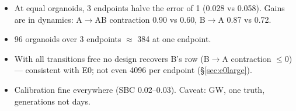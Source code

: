 \documentclass[10pt,a4paper]{article}
\newcommand{\blk}[1]{\par\needspace{5\baselineskip}\smallskip{\sffamily\bfseries\color{inkgray}#1}\par}
\newcommand{\Comment}{\blk{Comment}}
\begin{document}
\Comment
\begin{itemize}
\item At equal organoids, 3 endpoints halve the error of 1 (0.028 vs 0.058). Gains are in dynamics: A$\to$AB contraction 0.90 vs 0.60, B$\to$A 0.87 vs 0.72.
\item 96 organoids over 3 endpoints $\approx$ 384 at one endpoint.
\item With all transitions free no design recovers B's row (B$\to$A contraction $\le 0$) --- consistent with E0; not even 4096 per endpoint (\S\ref{sec:e0large}).
\item Calibration fine everywhere (SBC 0.02--0.03). Caveat: GW, one truth, generations not days.
\end{itemize}

\end{document}
